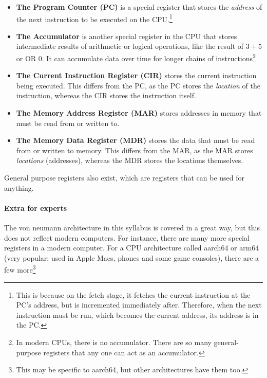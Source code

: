 \documentclass[../main.tex]{subfiles}
\begin{document}
\begin{itemize}
    \item \textbf{The Program Counter (PC)} is a special register that stores the \emph{address} of the next instruction to be executed on the CPU.\footnote{This is because on the fetch stage, it fetches the current instruction at the PC's address, but is incremented immediately after. Therefore, when the next instruction must be run, which becomes the current address, its address is in the PC.}
\item \textbf{The Accumulator} is another special register in the CPU that stores intermediate results of arithmetic or logical operations, like the result of $3+5$ or { OR 0}. It can accumulate data over time for longer chains of instructions\footnote{In modern CPUs, there is no accumulator. There are so many general-purpose registers that any one can act as an accumulator.}
    \item \textbf{The Current Instruction Register (CIR)} stores the current instruction being executed. This differs from the PC, as the PC stores the \emph{location} of the instruction, whereas the CIR stores the instruction itself.
    \item \textbf{The Memory Address Register (MAR)} stores addresses in memory that must be read from or written to.
    \item \textbf{The Memory Data Register (MDR)} stores the data that must be read from or written to memory. This differs from the MAR, as the MAR stores \emph{locations} (addresses), whereas the MDR stores the locations themselves.
\end{itemize}

General purpose registers also exist, which are registers that can be used for anything.

\paragraph{Extra for experts}

The von neumann architecture in this syllabus is covered in a great way, but this does not reflect modern computers. For instance, there are many more special registers in a modern computer. For a CPU architecture called {\ccmono aarch64} or {\ccmono arm64} (very popular; used in Apple Macs, phones and some game consoles), there are a few more\footnote{This may be specific to aarch64, but other architectures have them too.}
\end{document}
